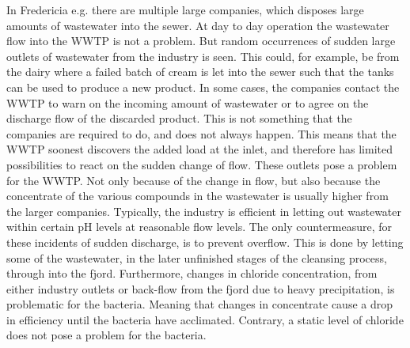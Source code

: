 In Fredericia e.g. there are multiple large companies, which disposes large amounts of wastewater into the sewer. At day to day operation the wastewater flow into the WWTP is not a problem. But random occurrences of sudden large outlets of wastewater from the industry is seen. This could, for example, be from the dairy where a failed batch of cream is let into the sewer such that the tanks can be used to produce a new product. In some cases, the companies contact the WWTP to warn on the incoming amount of wastewater or to agree on the discharge flow of the discarded product. This is not something that the companies are required to do, and does not always happen. This means that the WWTP soonest discovers the added load at the inlet, and therefore has limited possibilities to react on the sudden change of flow.
These outlets pose a problem for the WWTP. Not only because of the change in flow, but also because the concentrate of the various compounds in the wastewater is usually higher from the larger companies. Typically, the industry is efficient in letting out wastewater within certain pH levels at reasonable flow levels. The only countermeasure, for these incidents of sudden discharge, is to prevent overflow. This is done by letting some of the wastewater, in the later unfinished stages of the cleansing process, through into the fjord. Furthermore, changes in chloride concentration, from either industry outlets or back-flow from the fjord due to heavy precipitation, is problematic for the bacteria. Meaning that changes in concentrate cause a drop in efficiency until the bacteria have acclimated. Contrary, a static level of chloride does not pose a problem for the bacteria. 


